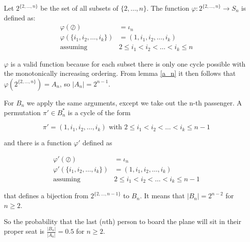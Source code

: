 \begin{defn}\label{func}
Let $2^{\{2,\ldots,n\}}$ be the set of all subsets of $\{2,\ldots,n\}$. The function $\varphi: 2^{\{2,\ldots,n\}} \rightarrow S_n$ is defined as:
\begin{equation*}
    \begin{split}
        \varphi(\oslash) & = \iota_n \\
        \varphi(\{i_1, i_2,\ldots, i_k\}) & =  (1, i_1, i_2,\ldots, i_k) \\
             \text{assuming } & 2 \leq i_1 < i_2 < \ldots < i_k \leq n
    \end{split}
\end{equation*}
\end{defn}

$\varphi$ is a valid function because for each subset there is only one cycle possible with the monotonically increasing ordering. From lemma \ref{a_n} it then follows that  $\varphi(2^{\{2,\ldots,n\}}) = A_n$, so $|A_n| = 2^{n -1}$.

For $B_n$ we apply the same arguments, except we take out the n-th passenger. A permutation $\pi' \in B_n^*$ is a cycle of the form

\begin{equation*}
\pi' = (1, i_1, i_2,\ldots, i_k)  \text{ with } 2 \leq i_1 < i_2 < \ldots < i_k \leq n -1
\end{equation*}  

and there is a function $\varphi'$ defined as 

\begin{equation*}
    \begin{split}
        \varphi'(\oslash) & = \iota_n \\
        \varphi'(\{i_1, i_2,\ldots, i_k\}) & =  (1, i_1, i_2,\ldots, i_k) \\
             \text{assuming } & 2 \leq i_1 < i_2 < \ldots < i_k \leq n -1
    \end{split}
\end{equation*}

that defines a bijection from $2^{\{2,\ldots,n - 1\}}$ to $B_n$. It means that $|B_n| = 2^{n - 2}$ for $n \geq 2$.

So the probability that the last ($n$th) person to board the plane will sit in their proper seat is $\frac{|B_n|}{|A_n|} = 0.5$ for $n \geq 2$.
